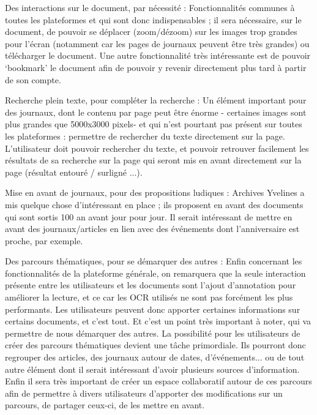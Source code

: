    Des interactions sur le document, par nécessité : Fonctionnalités communes à toutes les plateformes et qui sont donc indispensables ;
    il sera nécessaire, sur le document, de pouvoir se déplacer (zoom/dézoom) sur les images trop grandes pour l’écran
    (notamment car les pages de journaux peuvent être très grandes) ou télécharger le document. Une autre fonctionnalité
    très intéressante est de pouvoir ‘bookmark’ le document afin de pouvoir y revenir directement plus tard à partir de son compte.

    Recherche plein texte, pour compléter la recherche : Un élément important pour des journaux, dont le contenu par page
    peut être énorme - certaines images sont plus grandes que 5000x3000 pixels- et qui n’est pourtant pas présent
    sur toutes les plateformes : permettre de rechercher du texte directement sur la page. L’utilisateur doit pouvoir rechercher du texte,
    et pouvoir retrouver facilement les résultats de sa recherche sur la page qui seront mis en avant directement sur la page
    (résultat entouré / surligné ...).

    Mise en avant de journaux, pour des propositions ludiques : Archives Yvelines a mis quelque chose d’intéressant en place ;
    ils proposent en avant des documents qui sont sortis 100 an avant jour pour jour. Il serait intéressant de mettre en avant
    des journaux/articles en lien avec des événements dont l’anniversaire est proche, par exemple.

    Des parcours thématiques, pour se démarquer des autres : Enfin concernant les fonctionnalités de la plateforme générale,
    on remarquera que la seule interaction présente entre les utilisateurs et les documents sont l’ajout d’annotation
    pour améliorer la lecture, et ce car les OCR utilisés ne sont pas forcément les plus performants. Les utilisateurs
    peuvent donc apporter certaines informations sur certains documents, et c’est tout. Et c’est un point très important à noter,
    qui va permettre de nous démarquer des autres.  La possibilité pour les utilisateurs de créer des parcours thématiques devient
    une tâche primordiale. Ils pourront donc regrouper des articles, des journaux autour de dates, d’événements...
    ou de tout autre élément dont il serait intéressant d’avoir plusieurs sources d’information. Enfin il sera très important
    de créer un espace collaboratif autour de ces parcours afin de permettre à divers utilisateurs d’apporter des modifications sur un parcours,
    de partager ceux-ci, de les mettre en avant.

